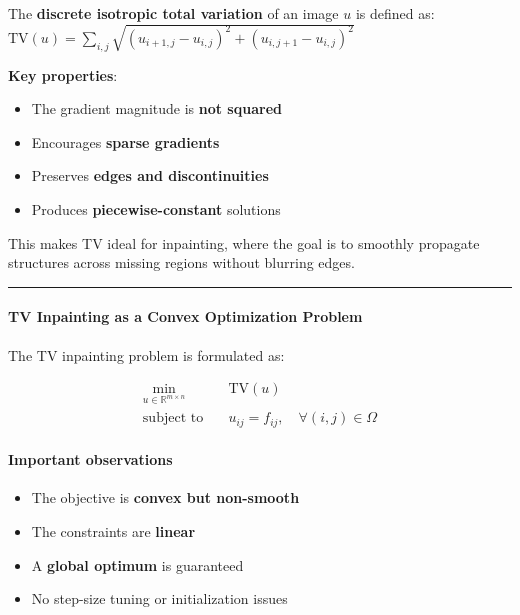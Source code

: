 \documentclass[11pt]{article}
\providecommand{\tightlist}{%
      \setlength{\itemsep}{0pt}\setlength{\parskip}{0pt}}
\begin{document}
The \textbf{discrete isotropic total variation} of an image \(u\) is
defined as:
\(\mathrm{TV}(u) = \sum_{i,j} \sqrt{ \left(u_{i+1,j} - u_{i,j}\right)^2 + \left(u_{i,j+1} - u_{i,j}\right)^2 }\)

\textbf{Key properties}:

\begin{itemize}
\tightlist
\item
  The gradient magnitude is \textbf{not squared}
\item
  Encourages \textbf{sparse gradients}
\item
  Preserves \textbf{edges and discontinuities}
\item
  Produces \textbf{piecewise-constant} solutions
\end{itemize}

This makes TV ideal for inpainting, where the goal is to smoothly
propagate structures across missing regions without blurring edges.

\begin{center}\rule{0.5\linewidth}{0.5pt}\end{center}

\hypertarget{tv-inpainting-as-a-convex-optimization-problem}{%
\paragraph{\texorpdfstring{\textbf{TV Inpainting as a Convex
Optimization
Problem}}{TV Inpainting as a Convex Optimization Problem}}\label{tv-inpainting-as-a-convex-optimization-problem}}

The TV inpainting problem is formulated as:

\[\begin{aligned}
\min_{u \in \mathbb{R}^{m \times n}} \quad
& \mathrm{TV}(u) \\
\text{subject to} \quad
& u_{ij} = f_{ij}, \quad \forall (i,j) \in \Omega
\end{aligned}\]

\hypertarget{important-observations}{%
\paragraph{\texorpdfstring{\textbf{Important
observations}}{Important observations}}\label{important-observations}}

\begin{itemize}
\tightlist
\item
  The objective is \textbf{convex but non-smooth}
\item
  The constraints are \textbf{linear}
\item
  A \textbf{global optimum} is guaranteed
\item
  No step-size tuning or initialization issues
\end{itemize}
\end{document}
